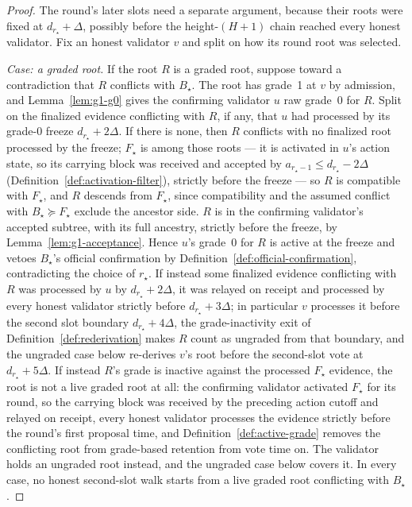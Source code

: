\begin{proof}
The round's later slots need a separate
argument, because their roots were fixed at \(d_{r_\star}+\Delta\),
possibly before the height-\((H{+}1)\) chain reached every honest
validator.  Fix an honest validator \(v\) and split
on how its round root was selected.

\emph{Case: a graded root.}  If the root \(R\) is a graded root,
suppose toward a contradiction that \(R\) conflicts with \(B_\star\).
The root has grade~1 at \(v\) by admission, and
Lemma~\ref{lem:g1-g0} gives the confirming validator \(u\) raw grade~0
for \(R\).  Split on the finalized evidence conflicting with \(R\), if
any, that \(u\) had processed by its grade-0 freeze
\(d_{r_\star}+2\Delta\).  If there is none, then \(R\) conflicts
with no finalized root processed by the freeze; \(F_\star\) is among
those roots --- it is activated in \(u\)'s action state, so its carrying
block was received and accepted by \(a_{r_\star-1}\leq
d_{r_\star}-2\Delta\)
(Definition~\ref{def:activation-filter}), strictly before the freeze --- so \(R\) is
compatible with \(F_\star\), and \(R\) descends
from \(F_\star\), since compatibility
and the assumed conflict with \(B_\star\succeq F_\star\) exclude the
ancestor side.  \(R\) is in the confirming validator's accepted
subtree, with its full ancestry, strictly before the freeze, by
Lemma~\ref{lem:g1-acceptance}.  Hence \(u\)'s grade~0 for \(R\) is active at the freeze
and vetoes \(B_\star\)'s official confirmation by
Definition~\ref{def:official-confirmation}, contradicting the choice of
\(r_\star\).  If instead some finalized evidence conflicting with
\(R\) was processed by \(u\) by \(d_{r_\star}+2\Delta\), it was relayed
on receipt and processed by every honest validator strictly before
\(d_{r_\star}+3\Delta\); in particular \(v\) processes it before the
second slot boundary \(d_{r_\star}+4\Delta\), the grade-inactivity exit
of Definition~\ref{def:rederivation} makes \(R\) count as ungraded
from that boundary, and the ungraded case below re-derives \(v\)'s root
before the second-slot vote at \(d_{r_\star}+5\Delta\).  If instead
\(R\)'s grade is inactive against
the processed \(F_\star\) evidence, the root is not a live graded root
at all: the confirming validator activated \(F_\star\) for its round, so
the carrying block was received by the preceding action cutoff and
relayed on receipt, every honest validator processes the evidence
strictly before the round's first proposal time, and
Definition~\ref{def:active-grade} removes the conflicting root from
grade-based retention from vote time on.  The validator holds an
ungraded root instead, and the ungraded case below covers it.  In every
case, no honest second-slot walk starts from a live graded root
conflicting with \(B_\star\).


\end{proof}
